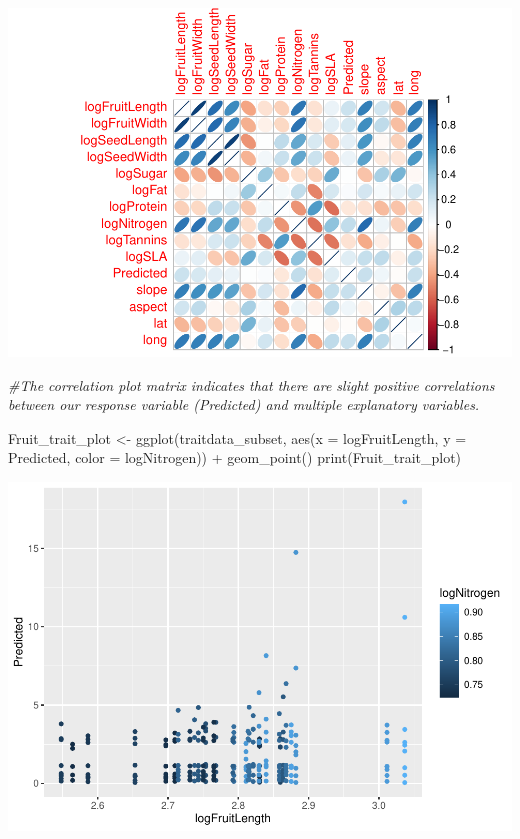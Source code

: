\documentclass[
  12pt,
]{article}
\newenvironment{Shaded}{\begin{snugshade}}{\end{snugshade}}
\newcommand{\AttributeTok}[1]{\textcolor[rgb]{0.77,0.63,0.00}{#1}}
\newcommand{\CommentTok}[1]{\textcolor[rgb]{0.56,0.35,0.01}{\textit{#1}}}
\newcommand{\FunctionTok}[1]{\textcolor[rgb]{0.00,0.00,0.00}{#1}}
\newcommand{\NormalTok}[1]{#1}
\newcommand{\OtherTok}[1]{\textcolor[rgb]{0.56,0.35,0.01}{#1}}
\newcommand{\SpecialCharTok}[1]{\textcolor[rgb]{0.00,0.00,0.00}{#1}}
\begin{document}
\includegraphics{project_draft_files/figure-latex/unnamed-chunk-4-1.pdf}

\begin{Shaded}
\begin{Highlighting}[]
\CommentTok{\#The correlation plot matrix indicates that there are slight positive correlations between our response variable (Predicted) and multiple explanatory variables.}

\NormalTok{Fruit\_trait\_plot }\OtherTok{\textless{}{-}} \FunctionTok{ggplot}\NormalTok{(traitdata\_subset, }\FunctionTok{aes}\NormalTok{(}\AttributeTok{x =}\NormalTok{ logFruitLength, }\AttributeTok{y =}\NormalTok{ Predicted, }\AttributeTok{color =}\NormalTok{ logNitrogen)) }\SpecialCharTok{+}
  \FunctionTok{geom\_point}\NormalTok{()}
\FunctionTok{print}\NormalTok{(Fruit\_trait\_plot)}
\end{Highlighting}
\end{Shaded}

\includegraphics{project_draft_files/figure-latex/unnamed-chunk-4-2.pdf}
\end{document}
